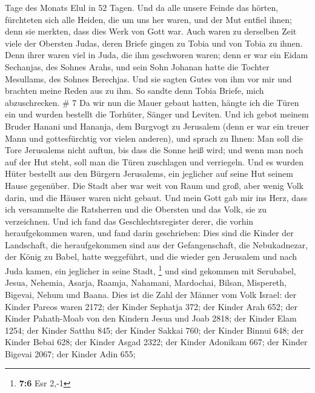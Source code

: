 Tage des Monats Elul in 52 Tagen.  Und da alle unsere
Feinde das hörten, fürchteten sich alle Heiden, die um uns her waren,
und der Mut entfiel ihnen; denn sie merkten, dass dies Werk von Gott
war.  Auch waren zu derselben Zeit viele der Obersten
Judas, deren Briefe gingen zu Tobia und von Tobia zu ihnen.
 Denn ihrer waren viel in Juda, die ihm geschworen waren;
denn er war ein Eidam Sechanjas, des Sohnes Arahs, und sein Sohn Johanan
hatte die Tochter Mesullams, des Sohnes Berechjas.  Und sie
sagten Gutes von ihm vor mir und brachten meine Reden aus zu ihm. So
sandte denn Tobia Briefe, mich abzuschrecken. \# 7  Da wir
nun die Mauer gebaut hatten, hängte ich die Türen ein und wurden
bestellt die Torhüter, Sänger und Leviten.  Und ich gebot
meinem Bruder Hanani und Hananja, dem Burgvogt zu Jerusalem (denn er war
ein treuer Mann und gottesfürchtig vor vielen anderen),  und
sprach zu Ihnen: Man soll die Tore Jerusalems nicht auftun, bis dass die
Sonne heiß wird; und wenn man noch auf der Hut steht, soll man die Türen
zuschlagen und verriegeln. Und es wurden Hüter bestellt aus den Bürgern
Jerusalems, ein jeglicher auf seine Hut seinem Hause gegenüber.
 Die Stadt aber war weit von Raum und groß, aber wenig Volk
darin, und die Häuser waren nicht gebaut.  Und mein Gott gab
mir ins Herz, dass ich versammelte die Ratsherren und die Obersten und
das Volk, sie zu verzeichnen. Und ich fand das Geschlechtsregister
derer, die vorhin heraufgekommen waren, und fand darin geschrieben:
 Dies sind die Kinder der Landschaft, die heraufgekommen
sind aus der Gefangenschaft, die Nebukadnezar, der König zu Babel, hatte
weggeführt, und die wieder gen Jerusalem und nach Juda kamen, ein
jeglicher in seine Stadt, \footnote{\textbf{7:6} Esr 2,-1} 
und sind gekommen mit Serubabel, Jesua, Nehemia, Asarja, Raamja,
Nahamani, Mardochai, Bilsan, Mispereth, Bigevai, Nehum und Baana. Dies
ist die Zahl der Männer vom Volk Israel:  der Kinder Pareos
waren 2172;  der Kinder Sephatja 372;  der
Kinder Arah 652;  der Kinder Pahath-Moab von den Kindern
Jesua und Joab 2818;  der Kinder Elam 1254; 
der Kinder Satthu 845;  der Kinder Sakkai 760;
 der Kinder Binnui 648;  der Kinder Bebai 628;
 der Kinder Asgad 2322;  der Kinder Adonikam
667;  der Kinder Bigevai 2067;  der Kinder
Adin 655;

